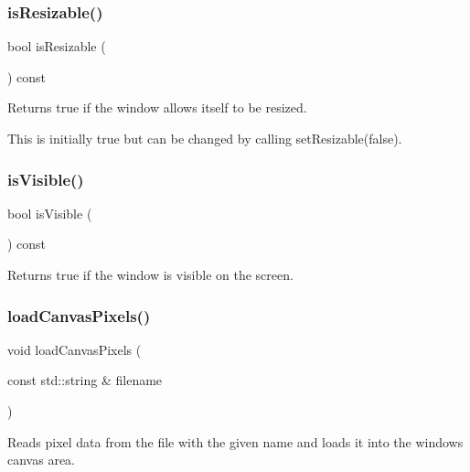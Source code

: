 \subsubsection{\texorpdfstring{is\+Resizable()}{isResizable()}}
{\footnotesize\ttfamily bool is\+Resizable (\begin{DoxyParamCaption}{ }\end{DoxyParamCaption}) const\hspace{0.3cm}{\ttfamily [virtual]}}



Returns true if the window allows itself to be resized. 

This is initially true but can be changed by calling set\+Resizable(false). \mbox{\label{classGWindow_a9d8a6cfb13917785c143e74d40e4e2be}} 
\subsubsection{\texorpdfstring{is\+Visible()}{isVisible()}}
{\footnotesize\ttfamily bool is\+Visible (\begin{DoxyParamCaption}{ }\end{DoxyParamCaption}) const\hspace{0.3cm}{\ttfamily [virtual]}}



Returns true if the window is visible on the screen. 

\mbox{\label{classGWindow_ae2462f15e288c06c5136e31a8ac8151c}} 
\subsubsection{\texorpdfstring{load\+Canvas\+Pixels()}{loadCanvasPixels()}}
{\footnotesize\ttfamily void load\+Canvas\+Pixels (\begin{DoxyParamCaption}\item[{const std\+::string \&}]{filename }\end{DoxyParamCaption})\hspace{0.3cm}{\ttfamily [virtual]}}



Reads pixel data from the file with the given name and loads it into the window\textquotesingle{}s canvas area. 


